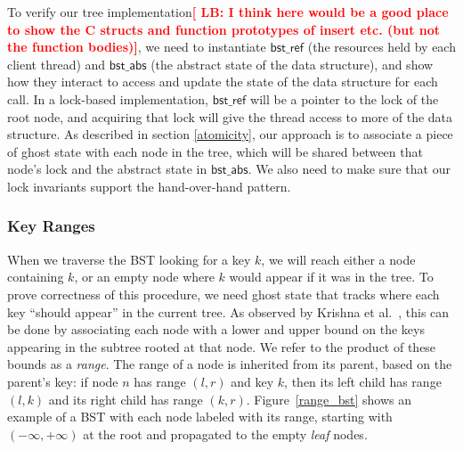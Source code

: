 \documentclass[runningheads]{llncs}
\newcommand{\LB}[1]{\textbf{\textcolor{red}{[ LB: #1]}}}
\newcommand{\treerep}{\ensuremath{\mathsf{bst\_abs}}}
\newcommand{\nodeboxrep}{\ensuremath{\mathsf{bst\_ref}}}
\begin{document}
To verify our tree implementation\LB{I think here would be a good place to show the C structs and function prototypes of insert etc. (but not the function bodies)}, we need to instantiate $\nodeboxrep$ (the resources held by each client thread) and $\treerep$ (the abstract state of the data structure), and show how they interact to access and update the state of the data structure for each call. In a lock-based implementation, $\nodeboxrep$ will be a pointer to the lock of the root node, and acquiring that lock will give the thread access to more of the data structure. As described in section \ref{atomicity}, our approach is to associate a piece of ghost state with each node in the tree, which will be shared between that node's lock and the abstract state in $\treerep$. We also need to make sure that our lock invariants support the hand-over-hand pattern.

\subsubsection{Key Ranges}%
When we traverse the BST looking for a key $k$, we will reach either a node containing $k$, or an empty node where $k$ would appear if it was in the tree. To prove correctness of this procedure, we need ghost state that tracks where each key ``should appear'' in the current tree. As observed by Krishna et al.~\cite{krishna2017flow}, this can be done by associating each node with a lower and upper bound on the keys appearing in the subtree rooted at that node. We refer to the product of these bounds as a \emph{range}. The range of a node is inherited from its parent, based on the parent's key: if node $n$ has range $(l, r)$ and key $k$, then its left child has range $(l, k)$ and its right child has range $(k, r)$. Figure~\ref{range_bst} shows an example of a BST with each node labeled with its range, starting with $(-\infty, +\infty)$ at the root and propagated to the empty \emph{leaf} nodes. 

\usetikzlibrary{positioning}
\end{document}
